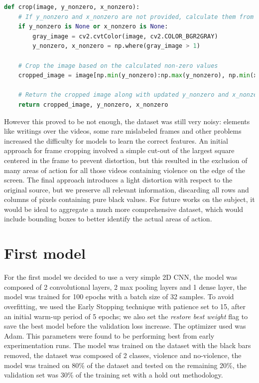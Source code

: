 \begin{lstlisting}[language=Python, caption={Image Cropper}, label={lst:ImageCropper}]
def crop(image, y_nonzero, x_nonzero):
    # If y_nonzero and x_nonzero are not provided, calculate them from the grayscale version of the image
    if y_nonzero is None or x_nonzero is None:
        gray_image = cv2.cvtColor(image, cv2.COLOR_BGR2GRAY)
        y_nonzero, x_nonzero = np.where(gray_image > 1)

    # Crop the image based on the calculated non-zero values
    cropped_image = image[np.min(y_nonzero):np.max(y_nonzero), np.min(x_nonzero):np.max(x_nonzero)]

    # Return the cropped image along with updated y_nonzero and x_nonzero values
    return cropped_image, y_nonzero, x_nonzero
\end{lstlisting}

However this proved to be not enough, the dataset was still very noisy: elements like writings over the videos, some rare mislabeled frames and other problems increased the difficulty for models to learn the correct features. An initial approach for frame cropping involved a simple cut-out of the largest square centered in the frame to prevent distortion, but this resulted in the exclusion of many areas of action for all those videos containing violence on the edge of the screen. The final approach introduces a light distortion with respect to the original source, but we preserve all relevant information, discarding all rows and columns of pixels containing pure black values. For future works on the subject, it would be ideal to aggregate a much more comprehensive dataset, which would include bounding boxes to better identify the actual areas of action.

\section{First model}
For the first model we decided to use a very simple 2D CNN, the model was composed of 2 convolutional layers, 2 max pooling layers and 1 dense layer, the model was trained for 100 epochs with a batch size of 32 samples. To avoid overfitting, we used the Early Stopping technique with patience set to 15, after an initial warm-up period of 5 epochs; we also set the \textit{restore best weight} flag to save the best model before the validation loss increase. The optimizer used was Adam. This parameters were found to be performing best from early experimentation runs. The model was trained on the dataset with the black bars removed, the dataset was composed of 2 classes, violence and no-violence, the model was trained on 80\% of the dataset and tested on the remaining 20\%, the validation set was 30\% of the training set with a hold out methodology.  

